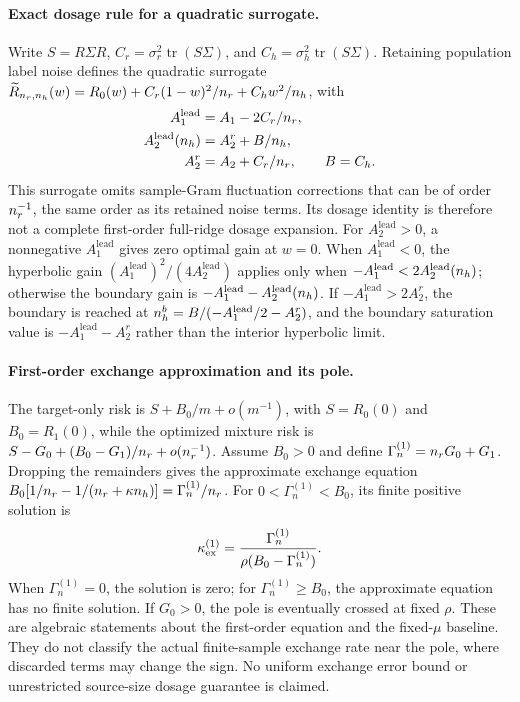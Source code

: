\paragraph{Exact dosage rule for a quadratic surrogate.}
Write $S=R\Sigma R$, $C_r=\sigma_r^2\operatorname{tr}(S\Sigma)$, and $C_h=\sigma_h^2\operatorname{tr}(S\Sigma)$. Retaining population label noise defines the quadratic surrogate
$\widetilde R_{n_r,n_h}(w)=R_0(w)+C_r(1-w)^2/n_r+C_hw^2/n_h$, with
\begin{align}
 A_1^{\mathrm{lead}}&=A_1-2C_r/n_r,\notag\\
 A_2^{\mathrm{lead}}(n_h)&=A_2^r+B/n_h,\notag\\
 A_2^r&=A_2+C_r/n_r,\qquad B=C_h.
\end{align}
This surrogate omits sample-Gram fluctuation corrections that can be of order $n_r^{-1}$, the same order as its retained noise terms. Its dosage identity is therefore not a complete first-order full-ridge dosage expansion. For $A_2^{\mathrm{lead}}>0$, a nonnegative $A_1^{\mathrm{lead}}$ gives zero optimal gain at $w=0$. When $A_1^{\mathrm{lead}}<0$, the hyperbolic gain $(A_1^{\mathrm{lead}})^2/(4A_2^{\mathrm{lead}})$ applies only when $-A_1^{\mathrm{lead}}<2A_2^{\mathrm{lead}}(n_h)$; otherwise the boundary gain is $-A_1^{\mathrm{lead}}-A_2^{\mathrm{lead}}(n_h)$. If $-A_1^{\mathrm{lead}}>2A_2^r$, the boundary is reached at $n_h^b=B/(-A_1^{\mathrm{lead}}/2-A_2^r)$, and the boundary saturation value is $-A_1^{\mathrm{lead}}-A_2^r$ rather than the interior hyperbolic limit.

\paragraph{First-order exchange approximation and its pole.}
The target-only risk is $S+B_0/m+o(m^{-1})$, with $S=R_0(0)$ and $B_0=R_1(0)$, while the optimized mixture risk is $S-G_0+(B_0-G_1)/n_r+o(n_r^{-1})$. Assume $B_0>0$ and define $\Gamma_n^{(1)}=n_r G_0+G_1$. Dropping the remainders gives the approximate exchange equation
$B_0[1/n_r-1/(n_r+\kappa n_h)]=\Gamma_n^{(1)}/n_r$.
For $0<\Gamma_n^{(1)}<B_0$, its finite positive solution is
\begin{equation}
 \kappa_{\mathrm{ex}}^{(1)}=\frac{\Gamma_n^{(1)}}{\rho(B_0-\Gamma_n^{(1)})}.
\end{equation}
When $\Gamma_n^{(1)}=0$, the solution is zero; for $\Gamma_n^{(1)}\ge B_0$, the approximate equation has no finite solution. If $G_0>0$, the pole is eventually crossed at fixed $\rho$. These are algebraic statements about the first-order equation and the fixed-$\mu$ baseline. They do not classify the actual finite-sample exchange rate near the pole, where discarded terms may change the sign. No uniform exchange error bound or unrestricted source-size dosage guarantee is claimed.

